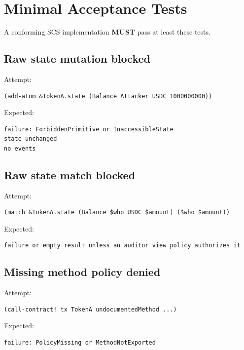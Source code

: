 \documentclass[11pt]{article}
\newcommand{\SCS}{\textsc{SCS}}
\newcommand{\MUST}{\textbf{MUST}}
\begin{document}
\section{Minimal Acceptance Tests}

A conforming \SCS{} implementation \MUST{} pass at least these tests.

\subsection{Raw state mutation blocked}

Attempt:

\begin{lstlisting}
(add-atom &TokenA.state (Balance Attacker USDC 1000000000))
\end{lstlisting}

Expected:

\begin{lstlisting}
failure: ForbiddenPrimitive or InaccessibleState
state unchanged
no events
\end{lstlisting}

\subsection{Raw state match blocked}

Attempt:

\begin{lstlisting}
(match &TokenA.state (Balance $who USDC $amount) ($who $amount))
\end{lstlisting}

Expected:

\begin{lstlisting}
failure or empty result unless an auditor view policy authorizes it
\end{lstlisting}

\subsection{Missing method policy denied}

Attempt:

\begin{lstlisting}
(call-contract! tx TokenA undocumentedMethod ...)
\end{lstlisting}

Expected:

\begin{lstlisting}
failure: PolicyMissing or MethodNotExported
\end{lstlisting}
\end{document}
